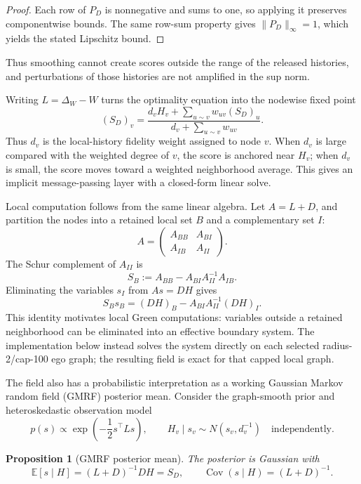 \documentclass[11pt]{article}
\newtheorem{proposition}[theorem]{Proposition}
\theoremstyle{definition}
\theoremstyle{remark}
\newcommand{\E}{\mathbb{E}}
\newcommand{\Cov}{\operatorname{Cov}}
\newcommand{\SD}{S_D}
\begin{document}
\begin{proof}
Each row of $P_D$ is nonnegative and sums to one, so applying it preserves componentwise bounds. The same row-sum property gives $\|P_D\|_{\infty}=1$, which yields the stated Lipschitz bound.
\end{proof}

Thus smoothing cannot create scores outside the range of the released histories, and perturbations of those histories are not amplified in the sup norm.

Writing $L=\Delta_W-W$ turns the optimality equation into the nodewise fixed point
\begin{equation}
    (\SD)_v=\frac{d_vH_v+\sum_{u\sim v}w_{uv}(\SD)_u}{d_v+\sum_{u\sim v}w_{uv}}.
    \label{eq:nodewise}
\end{equation}
Thus $d_v$ is the local-history fidelity weight assigned to node $v$. When $d_v$ is large compared with the weighted degree of $v$, the score is anchored near $H_v$; when $d_v$ is small, the score moves toward a weighted neighborhood average. This gives an implicit message-passing layer with a closed-form linear solve.

Local computation follows from the same linear algebra. Let $A=L+D$, and partition the nodes into a retained local set $B$ and a complementary set $I$:
\[
    A=\begin{pmatrix}A_{BB}&A_{BI}\\ A_{IB}&A_{II}\end{pmatrix}.
\]
The Schur complement of $A_{II}$ is
\[
    S_B:=A_{BB}-A_{BI}A_{II}^{-1}A_{IB}.
\]
Eliminating the variables $s_I$ from $As=DH$ gives
\[
    S_Bs_B=(DH)_B-A_{BI}A_{II}^{-1}(DH)_I.
\]
This identity motivates local Green computations: variables outside a retained neighborhood can be eliminated into an effective boundary system. The implementation below instead solves the system directly on each selected radius-2/cap-100 ego graph; the resulting field is exact for that capped local graph.

The field also has a probabilistic interpretation as a working Gaussian Markov random field (GMRF) posterior mean. Consider the graph-smooth prior and heteroskedastic observation model
\[
    p(s)\propto \exp\left(-\frac12s^\top Ls\right),
    \qquad
    H_v\mid s_v\sim N(s_v,d_v^{-1})\quad\text{independently}.
\]

\begin{proposition}[GMRF posterior mean]
The posterior is Gaussian with
\[
    \E[s\mid H]=(L+D)^{-1}DH=\SD,
    \qquad
    \Cov(s\mid H)=(L+D)^{-1}.
\]
\end{proposition}
\end{document}

